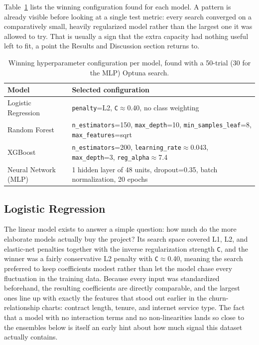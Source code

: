 \documentclass{article}
\begin{document}
Table~\ref{tab:hyperparameters} lists the winning configuration found for each model. A pattern is already visible before looking at a single test metric: every search converged on a comparatively small, heavily regularized model rather than the largest one it was allowed to try. That is usually a sign that the extra capacity had nothing useful left to fit, a point the Results and Discussion section returns to.

\begin{table}[H]
\centering
\small
\begin{tabular}{ll}
\toprule
\textbf{Model} & \textbf{Selected configuration} \\
\midrule
Logistic Regression & \texttt{penalty}=L2, \texttt{C}$\approx$0.40, no class weighting \\
Random Forest & \texttt{n\_estimators}=150, \texttt{max\_depth}=10, \texttt{min\_samples\_leaf}=8, \texttt{max\_features}=sqrt \\
XGBoost & \texttt{n\_estimators}=200, \texttt{learning\_rate}$\approx$0.043, \texttt{max\_depth}=3, \texttt{reg\_alpha}$\approx$7.4 \\
Neural Network (MLP) & 1 hidden layer of 48 units, dropout=0.35, batch normalization, 20 epochs \\
\bottomrule
\end{tabular}
\caption{\centering Winning hyperparameter configuration per model, found with a 50-trial (30 for the MLP) Optuna search.}
\label{tab:hyperparameters}
\end{table}

\subsection{Logistic Regression}
The linear model exists to answer a simple question: how much do the more elaborate models actually buy the project? Its search space covered L1, L2, and elastic-net penalties together with the inverse regularization strength \texttt{C}, and the winner was a fairly conservative L2 penalty with \texttt{C}$\approx$0.40, meaning the search preferred to keep coefficients modest rather than let the model chase every fluctuation in the training data. Because every input was standardized beforehand, the resulting coefficients are directly comparable, and the largest ones line up with exactly the features that stood out earlier in the churn-relationship charts: contract length, tenure, and internet service type. The fact that a model with no interaction terms and no non-linearities lands so close to the ensembles below is itself an early hint about how much signal this dataset actually contains.
\end{document}
